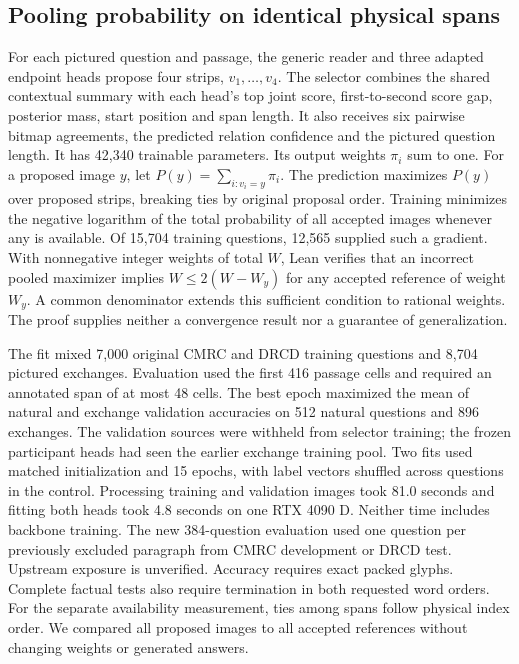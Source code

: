 \documentclass[12pt,a4paper]{article}
\providecommand{\DIFadd}[1]{{\protect\color{blue} \sf #1}} %
\begin{document}
\subsection*{\DIFadd{Pooling probability on identical physical spans}}
\DIFadd{For each pictured question and passage, the generic reader and three adapted endpoint heads propose four strips, $v_1,\ldots,v_4$. The selector combines the shared contextual summary with each head's top joint score, first-to-second score gap, posterior mass, start position and span length. It also receives six pairwise bitmap agreements, the predicted relation confidence and the pictured question length. It has 42,340 trainable parameters. Its output weights $\pi_i$ sum to one. For a proposed image $y$, let $P(y)=\sum_{i:v_i=y}\pi_i$. The prediction maximizes $P(y)$ over proposed strips, breaking ties by original proposal order. Training minimizes the negative logarithm of the total probability of all accepted images whenever any is available. Of 15,704 training questions, 12,565 supplied such a gradient. With nonnegative integer weights of total $W$, Lean verifies that an incorrect pooled maximizer implies $W\leq 2(W-W_y)$ for any accepted reference of weight $W_y$. A common denominator extends this sufficient condition to rational weights. The proof supplies neither a convergence result nor a guarantee of generalization.
}

\DIFadd{The fit mixed 7,000 original CMRC and DRCD training questions and 8,704 pictured exchanges. Evaluation used the first 416 passage cells and required an annotated span of at most 48 cells. The best epoch maximized the mean of natural and exchange validation accuracies on 512 natural questions and 896 exchanges. The validation sources were withheld from selector training; the frozen participant heads had seen the earlier exchange training pool. Two fits used matched initialization and 15 epochs, with label vectors shuffled across questions in the control. Processing training and validation images took 81.0 seconds and fitting both heads took 4.8 seconds on one RTX 4090 D. Neither time includes backbone training. The new 384-question evaluation used one question per previously excluded paragraph from CMRC development or DRCD test. Upstream exposure is unverified. Accuracy requires exact packed glyphs. Complete factual tests also require termination in both requested word orders. For the separate availability measurement, ties among spans follow physical index order. We compared all proposed images to all accepted references without changing weights or generated answers.
}
\end{document}
